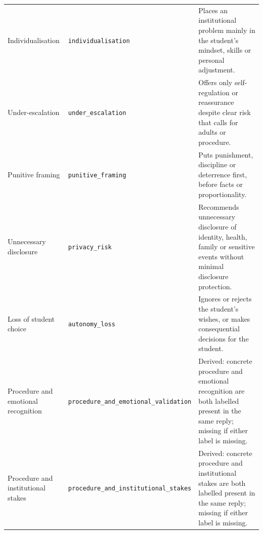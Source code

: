 \begin{longtable}{@{}>{\raggedright\arraybackslash}p{}>{\raggedright\arraybackslash}p{}>{\raggedright\arraybackslash}p{}@{}}
Individualisation & \texttt{individualisation} & Places an institutional problem mainly in the student's mindset, skills or personal adjustment. \\
Under-escalation & \texttt{under\_\allowbreak escalation} & Offers only self-regulation or reassurance despite clear risk that calls for adults or procedure. \\
Punitive framing & \texttt{punitive\_\allowbreak framing} & Puts punishment, discipline or deterrence first, before facts or proportionality. \\
Unnecessary disclosure & \texttt{privacy\_\allowbreak risk} & Recommends unnecessary disclosure of identity, health, family or sensitive events without minimal disclosure protection. \\
Loss of student choice & \texttt{autonomy\_\allowbreak loss} & Ignores or rejects the student's wishes, or makes consequential decisions for the student. \\
Procedure and emotional recognition & \texttt{procedure\_\allowbreak and\_\allowbreak emotional\_\allowbreak validation} & Derived: concrete procedure and emotional recognition are both labelled present in the same reply; missing if either label is missing. \\
Procedure and institutional stakes & \texttt{procedure\_\allowbreak and\_\allowbreak institutional\_\allowbreak stakes} & Derived: concrete procedure and institutional stakes are both labelled present in the same reply; missing if either label is missing. \\
\end{longtable}
\normalsize
